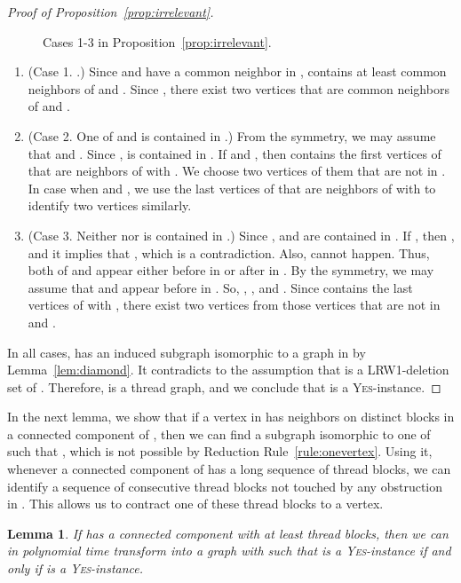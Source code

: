 \documentclass[11pt]{article}
\newtheorem{lemma}[theorem]{Lemma}
\theoremstyle{remark}
\newcommand{\YES}{\textsc{Yes}}
\begin{document}
\begin{proof}[Proof of Proposition~\ref{prop:irrelevant}]
\begin{figure}
\caption{Cases 1-3 in Proposition~\ref{prop:irrelevant}.} \label{fig:irrelevant}
\end{figure}




\begin{enumerate}
\item (Case 1. .) Since  and  have a common neighbor  in , 
 contains at least  common neighbors of  and .
Since , there exist two vertices  
that are common neighbors of  and .
\item (Case 2. One of  and  is contained in .) From the symmetry, we may assume that  and .
Since ,
 is contained in . If  and , then  contains the first  vertices 
of  that are neighbors of  with . We choose two vertices of them that are not in .
In case when  and , we use the last  vertices  of  that are neighbors of  with  to identify two vertices similarly.
\item (Case 3. Neither  nor  is contained in .)
Since ,  and  are contained in .
If , 
then ,  and it implies that , which is a contradiction.
Also,  cannot happen.
Thus, both of  and  appear either before  in  or after  in .
By the symmetry, we may assume that  and  appear before  in .
So, , , and .
Since  contains the last  vertices  of  with , there exist two vertices  from those  vertices that are not in  and .\end{enumerate}





In all cases,  has an induced subgraph isomorphic to a graph in  by Lemma~\ref{lem:diamond}. It contradicts to the assumption that  is a LRW1-deletion set of .
Therefore,  is a thread graph, and
we conclude that  is a \YES-instance.
\end{proof}

In the next lemma, we show that if a vertex  in  has neighbors on  distinct blocks in a connected component of , 
then we can find a subgraph  isomorphic to one of  such that , which is not possible by Reduction Rule~\ref{rule:onevertex}. 
Using it,  whenever a connected component of  has a long sequence of thread blocks, we can identify a sequence of consecutive thread blocks not touched by any
obstruction in . 
This allows us to contract one of these thread blocks to a vertex.


\begin{lemma}\label{lem:reducelength}
If  has a connected component with at least  thread blocks,
then we can in polynomial time transform  into a graph  with  such that  is a \textsc{Yes}-instance if and only if  is a \textsc{Yes}-instance.
\end{lemma}
\end{document}
